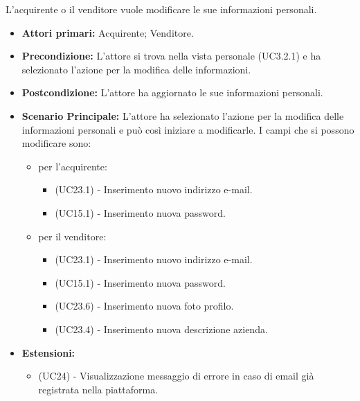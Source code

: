 L'acquirente o il venditore vuole modificare le sue informazioni personali.
\begin{itemize}
    \item \textbf{Attori primari:} Acquirente; Venditore.
    \item \textbf{Precondizione:} L'attore si trova nella vista personale (UC3.2.1) e ha selezionato l'azione per la modifica delle informazioni.
    \item \textbf{Postcondizione:} L'attore ha aggiornato le sue informazioni personali.
    \item \textbf{Scenario Principale:} L'attore ha selezionato l'azione per la modifica delle informazioni personali e può così iniziare a modificarle. I campi che si possono modificare sono:
    \begin{itemize}
        \item per l'acquirente:
        \begin{itemize}
            \item (UC23.1) - Inserimento nuovo indirizzo e-mail.
            \item (UC15.1) - Inserimento nuova password.
        \end{itemize}
        \item per il venditore:
        \begin{itemize}
            \item (UC23.1) - Inserimento nuovo indirizzo e-mail.
            \item (UC15.1) - Inserimento nuova password.
            \item (UC23.6) - Inserimento nuova foto profilo.
            \item (UC23.4) - Inserimento nuova descrizione azienda.
        \end{itemize}
    \end{itemize}
    \item \textbf{Estensioni:}
    \begin{itemize}
        \item (UC24) - Visualizzazione messaggio di errore in caso di email già registrata nella piattaforma.
    \end{itemize}
\end{itemize}

\resetSubUC

\label{UC15.1}

